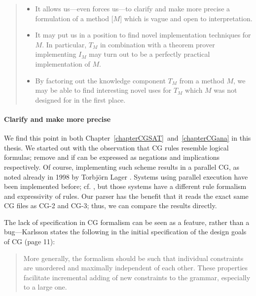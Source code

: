 \begin{quote}
\begin{itemize}
\item It allows us---even forces us---to clarify and make more precise a formulation of a method [$M$] which is vague and open to interpretation.
\item It may put us in a position to find novel implementation techniques for $M$. 
In particular, $T_M$ in combination with a theorem prover implementing $I_M$ may turn out to be a perfectly practical implementation of $M$.
\item By factoring out the knowledge component $T_M$ from a method $M$, 
we may be able to find interesting novel uses for $T_M$ which $M$ was not designed for in the first place.
\end{itemize}
\end{quote}


\paragraph{Clarify and make more precise} We find this point in both Chapter~\ref{chapterCGSAT}~and~\ref{chapterCGana} in this thesis. 
We started out with the observation that CG rules resemble logical formulas; {\sc remove} and {\sc if} can be expressed as negations and implications respectively. Of course, implementing such scheme results in a parallel CG, 
as noted already in 1998 by Torbjörn Lager \cite{lager98}.
Systems using parallel execution have been implemented before; cf. \cite{koskenniemi90,voutilainen1994designing,oflazer1997votingconstraints}, 
but those systems have a different rule formalism and expressivity of rules.
Our parser has the benefit that it reads the exact same CG files as CG-2 and CG-3; thus, we can compare the results directly. 


The lack of specification in CG formalism can be seen as a feature, rather than a bug---Karlsson states the following in the initial specification of the design goals of CG \cite{karlsson1995constraint} (page 11):

\begin{quote}
More generally, the formalism should be such that individual constraints are unordered and maximally independent of each other. These properties facilitate incremental adding of new constraints to the grammar, especially to a large one.
\end{quote}

